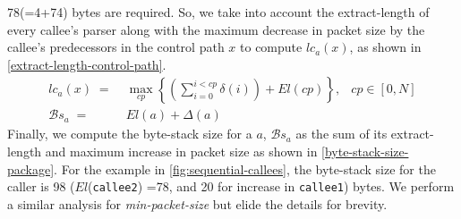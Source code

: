 \documentclass[letterpaper,twocolumn,10pt]{article}
\begin{document}
78(=4+74) bytes are required.  So, we take into account the
extract-length of every callee's parser along with the maximum
decrease in packet size by the callee's predecessors in the control
path $x$ to compute $lc_{a}(x)$, as shown in
\cref{extract-length-control-path}.
\begin{align}
lc_{a}(x) \; =& \; \max_{cp} \left\{ \left( \sum_{i=0}^{i<cp} \delta(i) \right)+ El(cp) \right\},&cp \in [0,N] \label{extract-length-control-path} \\
\mathcal{B}s_{a} \; =& \; El(a) + \Delta(a) & \label{byte-stack-size-package}
\end{align}
Finally, we compute the byte-stack size for a \uprogram $a$,
$\mathcal{B}s_{a}$  as the sum of its extract-length and maximum
increase in packet size as shown in \cref{byte-stack-size-package}.
For the example in \cref{fig:sequential-callees}, the byte-stack size
for the caller is 98 ($El$(\texttt{callee2}) =78, and 20 for increase
in \texttt{callee1}) bytes.
We perform a similar analysis for \textit{min-packet-size} but elide the details for brevity.
\end{document}
